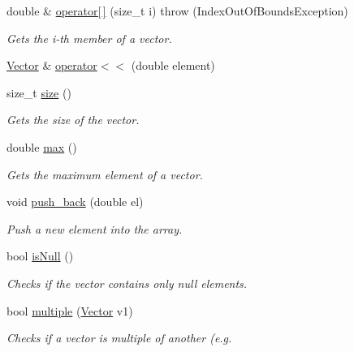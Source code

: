 \begin{CompactItemize}
double \& \hyperlink{classgrassmann_1_1Vector_ff6d641099c55e400a9116415fa86c6c}{operator\mbox{[}$\,$\mbox{]}} (size\_\-t i)  throw (IndexOutOfBoundsException)
\begin{CompactList}\small\item\em Gets the i-th member of a vector. \item\end{CompactList}\item 
\hyperlink{classgrassmann_1_1Vector}{Vector} \& \hyperlink{classgrassmann_1_1Vector_69966901d7ffcd3f0df9ffd37a637a1c}{operator$<$$<$} (double element)
\item 
size\_\-t \hyperlink{classgrassmann_1_1Vector_9ca025b6499bf75f21295c3fa49d03b4}{size} ()
\begin{CompactList}\small\item\em Gets the size of the vector. \item\end{CompactList}\item 
double \hyperlink{classgrassmann_1_1Vector_5b66d2b06688e0e4abfb7a2d62c73f35}{max} ()
\begin{CompactList}\small\item\em Gets the maximum element of a vector. \item\end{CompactList}\item 
void \hyperlink{classgrassmann_1_1Vector_b291b7fed796d989e4448c240857cf63}{push\_\-back} (double el)
\begin{CompactList}\small\item\em Push a new element into the array. \item\end{CompactList}\item 
bool \hyperlink{classgrassmann_1_1Vector_233859ed21cd1cbba69d240de0cf2ba3}{isNull} ()
\begin{CompactList}\small\item\em Checks if the vector contains only null elements. \item\end{CompactList}\item 
bool \hyperlink{classgrassmann_1_1Vector_96dd7bb0a8a2620e34b8a3ac1342deff}{multiple} (\hyperlink{classgrassmann_1_1Vector}{Vector} v1)
\begin{CompactList}\small\item\em Checks if a vector is multiple of another (e.g. \item\end{CompactList}\item 

\end{CompactItemize}
